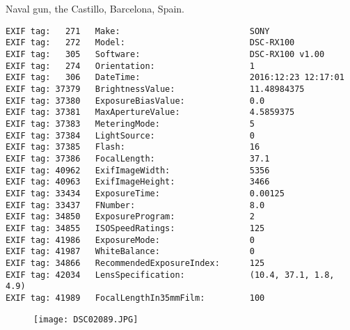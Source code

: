 \section{\protect{}}
\noindent Naval gun, the Castillo, Barcelona, Spain.
\noindent
\begin{lstlisting}
EXIF tag:   271   Make:                          SONY
EXIF tag:   272   Model:                         DSC-RX100
EXIF tag:   305   Software:                      DSC-RX100 v1.00
EXIF tag:   274   Orientation:                   1
EXIF tag:   306   DateTime:                      2016:12:23 12:17:01
EXIF tag: 37379   BrightnessValue:               11.48984375
EXIF tag: 37380   ExposureBiasValue:             0.0
EXIF tag: 37381   MaxApertureValue:              4.5859375
EXIF tag: 37383   MeteringMode:                  5
EXIF tag: 37384   LightSource:                   0
EXIF tag: 37385   Flash:                         16
EXIF tag: 37386   FocalLength:                   37.1
EXIF tag: 40962   ExifImageWidth:                5356
EXIF tag: 40963   ExifImageHeight:               3466
EXIF tag: 33434   ExposureTime:                  0.00125
EXIF tag: 33437   FNumber:                       8.0
EXIF tag: 34850   ExposureProgram:               2
EXIF tag: 34855   ISOSpeedRatings:               125
EXIF tag: 41986   ExposureMode:                  0
EXIF tag: 41987   WhiteBalance:                  0
EXIF tag: 34866   RecommendedExposureIndex:      125
EXIF tag: 42034   LensSpecification:             (10.4, 37.1, 1.8, 4.9)
EXIF tag: 41989   FocalLengthIn35mmFilm:         100

\end{lstlisting}
\clearpage
\begin{figure}
\raggedleft
\texttt{[image: DSC02089.JPG]}
\end{figure}


\clearpage
